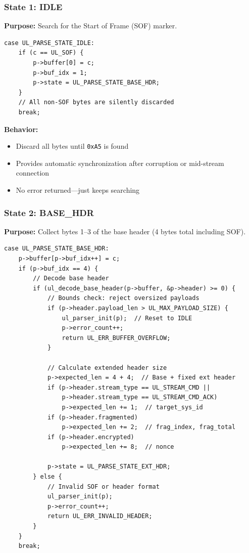 \documentclass[11pt,a4paper]{article}
\begin{document}
\subsubsection{State 1: IDLE}

\textbf{Purpose:} Search for the Start of Frame (SOF) marker.

\begin{lstlisting}[caption={IDLE State Implementation}]
case UL_PARSE_STATE_IDLE:
    if (c == UL_SOF) {
        p->buffer[0] = c;
        p->buf_idx = 1;
        p->state = UL_PARSE_STATE_BASE_HDR;
    }
    // All non-SOF bytes are silently discarded
    break;
\end{lstlisting}

\textbf{Behavior:}
\begin{itemize}[noitemsep]
    \item Discard all bytes until \texttt{0xA5} is found
    \item Provides automatic synchronization after corruption or mid-stream connection
    \item No error returned---just keeps searching
\end{itemize}

\subsubsection{State 2: BASE\_HDR}

\textbf{Purpose:} Collect bytes 1--3 of the base header (4 bytes total including SOF).

\begin{lstlisting}[caption={BASE\_HDR State Implementation}]
case UL_PARSE_STATE_BASE_HDR:
    p->buffer[p->buf_idx++] = c;
    if (p->buf_idx == 4) {
        // Decode base header
        if (ul_decode_base_header(p->buffer, &p->header) >= 0) {
            // Bounds check: reject oversized payloads
            if (p->header.payload_len > UL_MAX_PAYLOAD_SIZE) {
                ul_parser_init(p);  // Reset to IDLE
                p->error_count++;
                return UL_ERR_BUFFER_OVERFLOW;
            }

            // Calculate extended header size
            p->expected_len = 4 + 4;  // Base + fixed ext header
            if (p->header.stream_type == UL_STREAM_CMD || 
                p->header.stream_type == UL_STREAM_CMD_ACK)
                p->expected_len += 1;  // target_sys_id
            if (p->header.fragmented)
                p->expected_len += 2;  // frag_index, frag_total
            if (p->header.encrypted)
                p->expected_len += 8;  // nonce

            p->state = UL_PARSE_STATE_EXT_HDR;
        } else {
            // Invalid SOF or header format
            ul_parser_init(p);
            p->error_count++;
            return UL_ERR_INVALID_HEADER;
        }
    }
    break;
\end{lstlisting}
\end{document}
